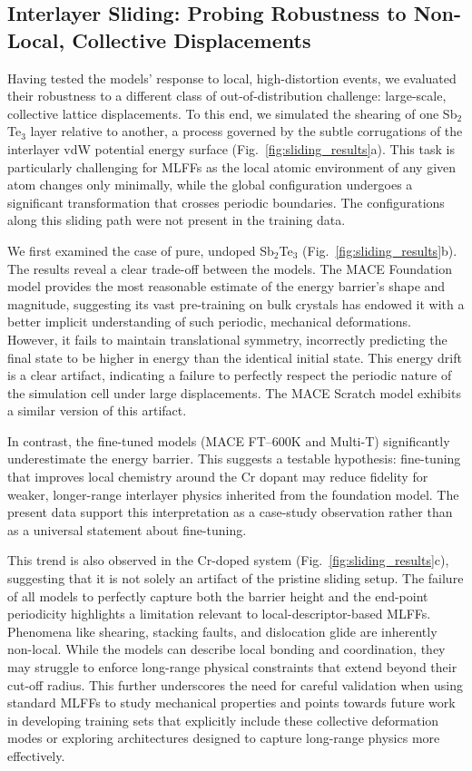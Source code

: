 \documentclass[pdflatex,sn-mathphys-num]{sn-jnl}%
\theoremstyle{thmstyleone}%
\theoremstyle{thmstyletwo}%
\theoremstyle{thmstylethree}%
\begin{document}
\subsection{Interlayer Sliding: Probing Robustness to Non-Local, Collective Displacements}

Having tested the models' response to local, high-distortion events, we evaluated their robustness to a different class of out-of-distribution challenge: large-scale, collective lattice displacements. To this end, we simulated the shearing of one Sb$_2$Te$_3$ layer relative to another, a process governed by the subtle corrugations of the interlayer vdW potential energy surface (Fig.~\ref{fig:sliding_results}a). This task is particularly challenging for MLFFs as the local atomic environment of any given atom changes only minimally, while the global configuration undergoes a significant transformation that crosses periodic boundaries. The configurations along this sliding path were not present in the training data.

We first examined the case of pure, undoped Sb$_2$Te$_3$ (Fig.~\ref{fig:sliding_results}b). The results reveal a clear trade-off between the models. The MACE Foundation model provides the most reasonable estimate of the energy barrier's shape and magnitude, suggesting its vast pre-training on bulk crystals has endowed it with a better implicit understanding of such periodic, mechanical deformations. However, it fails to maintain translational symmetry, incorrectly predicting the final state to be higher in energy than the identical initial state. This energy drift is a clear artifact, indicating a failure to perfectly respect the periodic nature of the simulation cell under large displacements. The MACE Scratch model exhibits a similar version of this artifact.

In contrast, the fine-tuned models (MACE FT--600K and Multi-T) significantly underestimate the energy barrier. This suggests a testable hypothesis: fine-tuning that improves local chemistry around the Cr dopant may reduce fidelity for weaker, longer-range interlayer physics inherited from the foundation model. The present data support this interpretation as a case-study observation rather than as a universal statement about fine-tuning.

This trend is also observed in the Cr-doped system (Fig.~\ref{fig:sliding_results}c), suggesting that it is not solely an artifact of the pristine sliding setup. The failure of all models to perfectly capture both the barrier height and the end-point periodicity highlights a limitation relevant to local-descriptor-based MLFFs. Phenomena like shearing, stacking faults, and dislocation glide are inherently non-local. While the models can describe local bonding and coordination, they may struggle to enforce long-range physical constraints that extend beyond their cut-off radius. This further underscores the need for careful validation when using standard MLFFs to study mechanical properties and points towards future work in developing training sets that explicitly include these collective deformation modes or exploring architectures designed to capture long-range physics more effectively.
\end{document}
